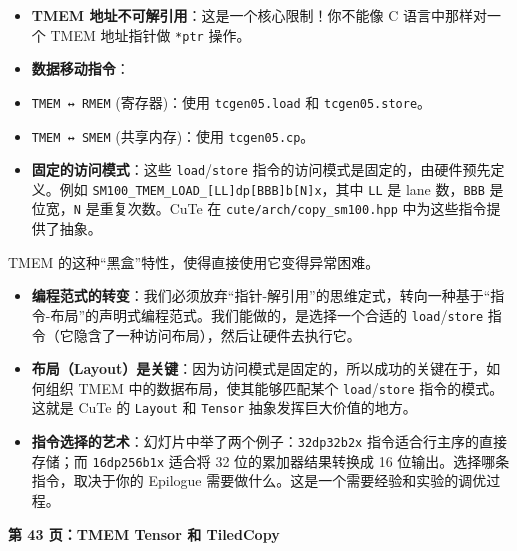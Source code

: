 \begin{itemize}
\item \textbf{TMEM 地址不可解引用}：这是一个核心限制！你不能像 C 语言中那样对一个 TMEM 地址指针做 \texttt{*ptr} 操作。
\item \textbf{数据移动指令}：
\item \texttt{TMEM ↔ RMEM} (寄存器)：使用 \texttt{tcgen05.\allowbreak{}load} 和 \texttt{tcgen05.\allowbreak{}store}。
\item \texttt{TMEM ↔ SMEM} (共享内存)：使用 \texttt{tcgen05.\allowbreak{}cp}。
\item \textbf{固定的访问模式}：这些 \texttt{load}/\allowbreak{}\texttt{store} 指令的访问模式是固定的，由硬件预先定义。例如 \texttt{S\allowbreak{}M\allowbreak{}1\allowbreak{}0\allowbreak{}0\allowbreak{}\_\allowbreak{}T\allowbreak{}M\allowbreak{}E\allowbreak{}M\allowbreak{}\_\allowbreak{}L\allowbreak{}O\allowbreak{}A\allowbreak{}D\allowbreak{}\_\allowbreak{}[\allowbreak{}L\allowbreak{}L\allowbreak{}]\allowbreak{}d\allowbreak{}p\allowbreak{}[\allowbreak{}B\allowbreak{}B\allowbreak{}B\allowbreak{}]\allowbreak{}b\allowbreak{}[\allowbreak{}N\allowbreak{}]\allowbreak{}x}，其中 \texttt{LL} 是 lane 数，\texttt{BBB} 是位宽，\texttt{N} 是重复次数。Cu\allowbreak{}Te 在 \texttt{cute/\allowbreak{}arch/\allowbreak{}copy\_\allowbreak{}sm100.\allowbreak{}hpp} 中为这些指令提供了抽象。
\end{itemize}

TMEM 的这种“黑盒”特性，使得直接使用它变得异常困难。

\begin{itemize}
\item \textbf{编程范式的转变}：我们必须放弃“指针-解引用”的思维定式，转向一种基于“指令-布局”的声明式编程范式。我们能做的，是选择一个合适的 \texttt{load}/\allowbreak{}\texttt{store} 指令（它隐含了一种访问布局），然后让硬件去执行它。
\item \textbf{布局（Layout）是关键}：因为访问模式是固定的，所以成功的关键在于，如何组织 TMEM 中的数据布局，使其能够匹配某个 \texttt{load}/\allowbreak{}\texttt{store} 指令的模式。这就是 Cu\allowbreak{}Te 的 \texttt{Layout} 和 \texttt{Tensor} 抽象发挥巨大价值的地方。
\item \textbf{指令选择的艺术}：幻灯片中举了两个例子：\texttt{32dp32b2x} 指令适合行主序的直接存储；而 \texttt{16dp256b1x} 适合将 32 位的累加器结果转换成 16 位输出。选择哪条指令，取决于你的 Epilogue 需要做什么。这是一个需要经验和实验的调优过程。
\end{itemize}

\textbf{第 43 页：TMEM Tensor 和 Tiled\allowbreak{}Copy}

